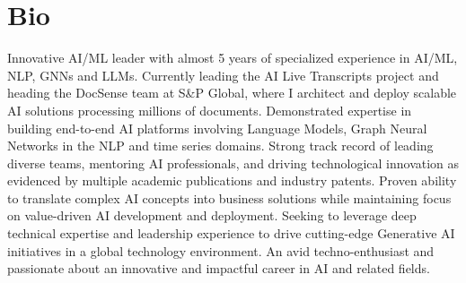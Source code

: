 \documentclass[A4,8pt]{article}
\begin{document}


\section{Bio}
\small{Innovative AI/ML leader with almost 5 years of specialized experience in AI/ML, NLP, GNNs and LLMs. Currently leading the AI Live Transcripts project and heading the DocSense team at S\&P Global, where I architect and deploy scalable AI solutions processing millions of documents. Demonstrated expertise in building end-to-end AI platforms involving Language Models, Graph Neural Networks in the NLP and time series domains. Strong track record of leading diverse teams, mentoring AI professionals, and driving technological innovation as evidenced by multiple academic publications and industry patents. Proven ability to translate complex AI concepts into business solutions while maintaining focus on value-driven AI development and deployment. Seeking to leverage deep technical expertise and leadership experience to drive cutting-edge Generative AI initiatives in a global technology environment. An avid techno-enthusiast and passionate about an innovative and impactful career in AI and related fields.}
\end{document}
